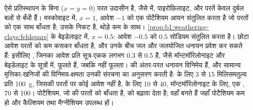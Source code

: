 ऐसे प्रतिस्थापन के बिना ($x = y = 0$) परत उदासीन है, जैसे  में,  पाइरोफ़िलाइट, और परतें केवल दुर्बल बलों से बँधी हैं।
मस्कोवाइट में, $x = 1$, आवेश $-1$ को एक पोटैशियम आयन संतुलित करता है जो परतों को एक साथ बाँधता है;  उसके निकट है, थोड़े कम के साथ। \cref{prop:b1:weathering-clays:feldspars} के बेइडेलाइट में, $x = 0.5$: आवेश $-0.5$ को $0.5$ सोडियम संतुलित करता है। छोटा आवेश परतों को कम कसकर बाँधता है, और उनके बीच जल और जलयोजित धनायन प्रवेश कर सकते हैं: इसीलिए , जिनका आवेश प्रति सूत्र-एकक लगभग 0.3 से 0.5 है, जैसे मॉन्टमॉरिलोनाइट और बेइडेलाइट के सूत्रों में, फूलते हैं, जबकि  नहीं फूलता।
 की अंतर-परत धनायन विनिमेय हैं, और सामान्य मृत्तिका-खनिजों की विनिमय-क्षमता उनकी संरचना का अनुसरण करती है:  के लिए 3 से 15 मिलिसमतुल्य प्रति \qty{100}{g}, जिसकी परतों पर कोई आवेश नहीं है,  के लिए 10 से 40, मॉन्टमॉरिलोनाइट के लिए, एक , 70 से 100। पोटैशियम, जो  की परतों को बाँधता है,  को बढ़ावा देता है;  वहाँ बनते हैं जहाँ पोटैशियम कम हो और कैल्शियम तथा मैग्नीशियम उपलब्ध हों।

